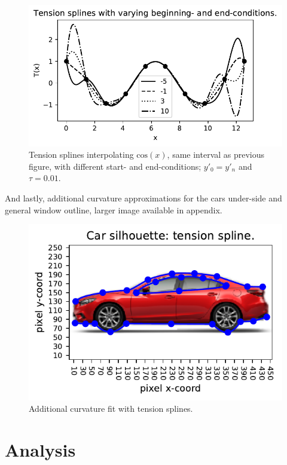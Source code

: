 \documentclass{article}
\begin{document}
  \begin{figure}[!h]
    \center
    \includegraphics{figs/p2-fit-10-points-y0.pdf}
    \caption{Tension splines interpolating $\mathrm{cos}(x)$, same interval as
    previous figure, with different start- and end-conditions; $y'_0 = y'_n$
    and $\tau = 0.01$.}
  \end{figure}

  And lastly, additional curvature approximations for the cars under-side and
  general window outline, larger image available in appendix.

  \begin{figure}[!h]
    \center
    \includegraphics{figs/p2-car-tension-splines-extra.pdf}
    \caption{Additional curvature fit with tension splines.}
  \end{figure}

\section*{Analysis}
\end{document}
